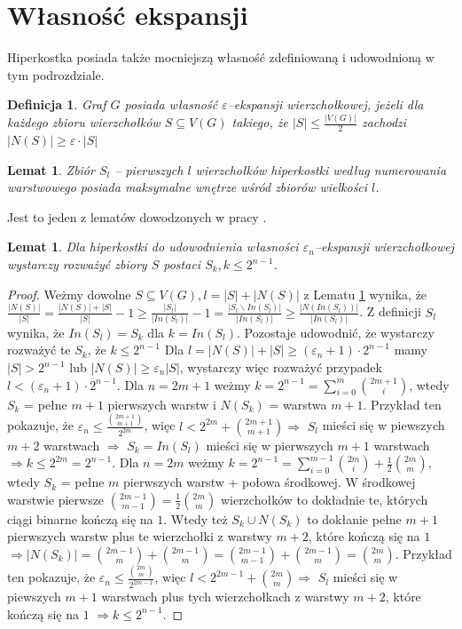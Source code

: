 \documentclass{pracamgr}
\newtheorem{defi}[theorem]{Definicja}
\newtheorem{lemma}[theorem]{Lemat}
\begin{document}
  \section{Własność ekspansji}
   Hiperkostka posiada także mocniejszą własność zdefiniowaną i udowodnioną w tym podrozdziale.
   \begin{defi}\label{epsilon ekspansja wierzcholkowa}
    Graf $G$ posiada własność \emph{$\varepsilon$--ekspansji wierzchołkowej}, jeżeli dla każdego zbioru wierzchołków $S\subseteq V(G)$ takiego,
    że $|S|\le\frac{|V(G)|}{2}$ zachodzi $|N(S)|\ge\varepsilon\cdot|S|$
   \end{defi}
   \begin{lemma}\label{HAR1}
    Zbiór $S_l$ -- pierwszych $l$ wierzchołków hiperkostki według numerowania warstwowego posiada maksymalne wnętrze wśród zbiorów wielkości $l$.  
   \end{lemma}
   Jest to jeden z lematów dowodzonych w pracy \cite{HAR}.
   \begin{lemma}\label{S->S_k}
    Dla hiperkostki do udowodnienia własności $\varepsilon_n$--ekspansji wierzchołkowej wystarczy rozważyć zbiory $S$ postaci $S_k,k\le 2^{n-1}$.
   \end{lemma}
   \begin{proof}
    Weżmy dowolne $S\subseteq V(G), l=|S|+|N(S)|$ z Lematu \ref{HAR1} wynika, że
    $\frac{|N(S)|}{|S|}=\frac{|N(S)|+|S|}{|S|}-1\ge\frac{|S_l|}{|In(S_l)|}-1=\frac{|S_l\backslash In(S_l)|}{|In(S_l)|}\ge\frac{|N(In(S_l))|}{|In(S_l)|}$.
    Z definicji $S_l$ wynika, że $In(S_l)=S_k$ dla $k=In(S_l)$.\newline
    Pozostaje udowodnić, że wystarczy rozważyć te $S_k$, że $k\le2^{n-1}$\newline
    Dla $l=|N(S)|+|S|\ge(\varepsilon_n+1)\cdot 2^{n-1}$ mamy $|S|>2^{n-1}$ lub $|N(S)|\ge\varepsilon_n|S|$, wystarczy więc rozważyć przypadek
    $l<(\varepsilon_n+1)\cdot 2^{n-1}$.\newline
    Dla $n=2m+1$ weżmy $k=2^{n-1}=\sum_{i=0}^{m}{2m+1 \choose i}$, wtedy $S_k$ = pełne $m+1$ pierwszych warstw i $N(S_k)$ = warstwa $m+1$.
    Przykład ten pokazuje, że $\varepsilon_n\le\frac{{2m+1 \choose m+1}}{2^{2m}}$,
    więc $l<2^{2m}+{2m+1 \choose m+1}\Rightarrow$ $S_l$ mieści się w piewszych $m+2$ warstwach
    $\Rightarrow$ $S_k=In(S_l)$ mieści się w pierwszych $m+1$ warstwach $\Rightarrow k\le 2^{2m}=2^{n-1}$.\newline
    Dla $n=2m$ weżmy $k=2^{n-1}=\sum_{i=0}^{m-1}{2m \choose i}+\frac{1}{2}{2m\choose m}$, wtedy $S_k$ = pełne $m$ pierwszych warstw + połowa środkowej.
    W środkowej warstwie pierwsze ${2m-1\choose m-1}=\frac{1}{2}{2m \choose m}$ wierzchołków to dokładnie te, których ciągi binarne kończą się na $1$.
    Wtedy też $S_k\cup N(S_k)$ to dokłanie pełne $m+1$ pierwszych warstw plus te wierzchołki z warstwy $m+2$, które kończą się na $1$
    $\Rightarrow |N(S_k)|={2m-1\choose m}+{2m-1\choose m}={2m-1\choose m-1}+{2m-1 \choose m}={2m\choose m}$.
    Przykład ten pokazuje, że $\varepsilon_n\le\frac{{2m \choose m}}{2^{2m-1}}$,
    więc $l<2^{2m-1}+{2m \choose m}\Rightarrow$ $S_l$ mieści się w piewszych $m+1$ warstwach plus tych wierzchołkach z warstwy $m+2$, które kończą się na $1$
    $\Rightarrow k\le2^{n-1}$.
   \end{proof}
\end{document}

